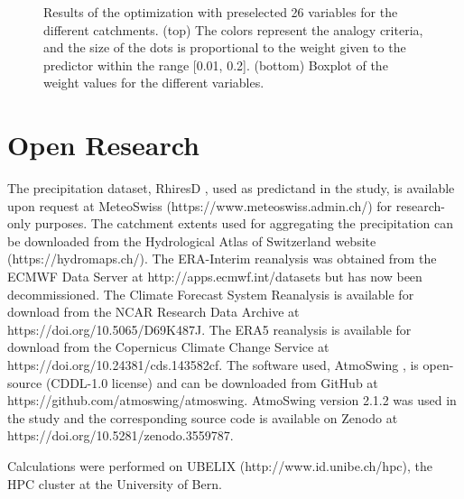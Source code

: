 \documentclass[draft]{agujournal2019}
\begin{document}
\begin{figure}[H]
	\noindent{}
	\vspace{-0.8cm}
	\caption{Results of the optimization with preselected 26 variables for the different catchments. (top) The colors represent the analogy criteria, and the size of the dots is proportional to the weight given to the predictor within the range [0.01, 0.2]. (bottom) Boxplot of the weight values for the different variables.}
	\label{fig_variables_homogen}
\end{figure}



\FloatBarrier

\section*{Open Research}
The precipitation dataset, RhiresD \cite{MeteoSwiss2021}, used as predictand in the study, is available upon request at MeteoSwiss (https://www.meteoswiss.admin.ch/) for research-only purposes. The catchment extents \cite{HADES} used for aggregating the precipitation can be downloaded from the Hydrological Atlas of Switzerland website (https://hydromaps.ch/). The ERA-Interim reanalysis \cite{Dee2011a} was obtained from the ECMWF Data Server at http://apps.ecmwf.int/datasets but has now been decommissioned. The Climate Forecast System Reanalysis \cite[CFSR]{CFSR} is available for download from the NCAR Research Data Archive at https://doi.org/10.5065/D69K487J. The ERA5 reanalysis \cite[Complete ERA5 global atmospheric reanalysis]{ERA5} is available for download from the Copernicus Climate Change Service at https://doi.org/10.24381/cds.143582cf. The software used, AtmoSwing \cite{Horton2019b}, is open-source (CDDL-1.0 license) and can be downloaded from GitHub at https://github.com/atmoswing/atmoswing. AtmoSwing version 2.1.2 was used in the study and the corresponding source code is available on Zenodo at https://doi.org/10.5281/zenodo.3559787.


\acknowledgments
Calculations were performed on UBELIX (http://www.id.unibe.ch/hpc), the HPC cluster at the University of Bern. 





\end{document}
